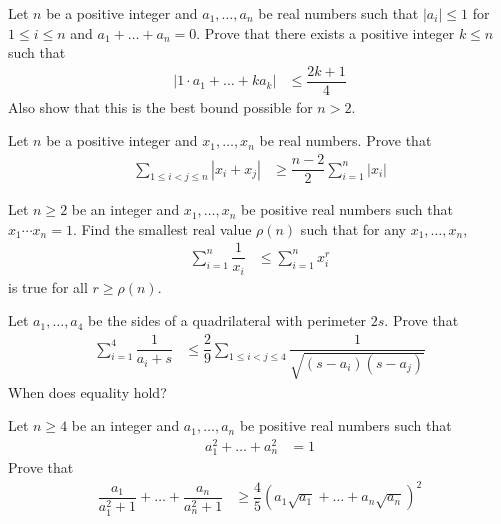 \documentclass{subfile}
\begin{document}
		\begin{problem}
			Let $n$ be a positive integer and $a_{1},\ldots,a_{n}$ be real numbers such that $|a_{i}|\leq 1$ for $1\leq i\leq n$ and $a_{1}+\ldots+a_{n}=0$. Prove that there exists a positive integer $k\leq n$ such that
				\begin{align*}
					|1\cdot a_{1}+\ldots+ka_{k}|
						& \leq \dfrac{2k+1}{4}
				\end{align*}
			Also show that this is the best bound possible for $n>2$.
		\end{problem}
	
		\begin{problem}
			Let $n$ be a positive integer and $x_{1},\ldots,x_{n}$ be real numbers. Prove that
				\begin{align*}
					\sum_{1\leq i<j\leq n}|x_{i}+x_{j}|
						& \geq \dfrac{n-2}{2}\sum_{i=1}^{n}|x_{i}|
				\end{align*}
		\end{problem}
	
		\begin{problem}
			Let $n\geq 2$ be an integer and $x_{1},\ldots,x_{n}$ be positive real numbers such that $x_{1}\cdots x_{n}=1$. Find the smallest real value $\rho(n)$ such that for any $x_{1},\ldots,x_{n}$,
				\begin{align*}
					\sum_{i=1}^{n}\dfrac{1}{x_{i}}
						& \leq \sum_{i=1}^{n}x_{i}^{r}
				\end{align*}
			is true for all $r\geq\rho(n)$.
		\end{problem}
	
		\begin{problem}
			Let $a_{1},\ldots,a_{4}$ be the sides of a quadrilateral with perimeter $2s$. Prove that
				\begin{align*}
					\sum_{i=1}^{4}\dfrac{1}{a_{i}+s}
						& \leq \dfrac{2}{9}\sum_{1\leq i<j\leq 4}\dfrac{1}{\sqrt{(s-a_{i})(s-a_{j})}}
				\end{align*}
			When does equality hold?
		\end{problem}
	
		\begin{problem}
			Let $n\geq 4$ be an integer and $a_{1},\ldots,a_{n}$ be positive real numbers such that
				\begin{align*}
					a_{1}^{2}+\ldots+a_{n}^{2}
						& = 1
				\end{align*}
			Prove that
				\begin{align*}
					\dfrac{a_{1}}{a_{1}^{2}+1}+\ldots+\dfrac{a_{n}}{a_{n}^{2}+1}
						& \geq \dfrac{4}{5}\left(a_{1}\sqrt{a_{1}}+\ldots+a_{n}\sqrt{a_{n}}\right)^{2}
				\end{align*}
		\end{problem}
	
\end{document}
